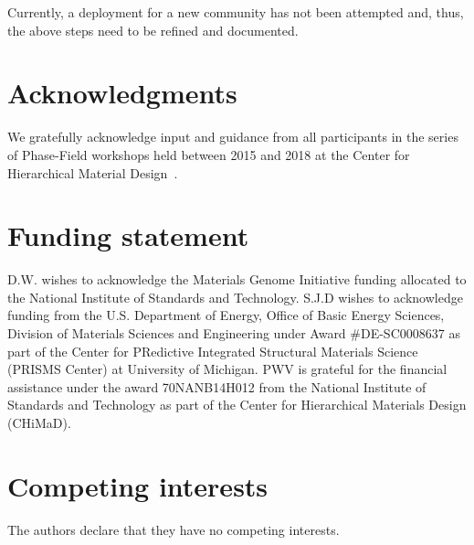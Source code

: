 \documentclass{jors}
\begin{document}
Currently, a deployment for a new community has not been attempted
and, thus, the above steps need to be refined and documented.

\section*{Acknowledgments}

We gratefully acknowledge input and guidance from all participants in
the series of Phase-Field workshops held between 2015 and 2018 at the
Center for Hierarchical Material Design~\cite{workshops}.

\section*{Funding statement}

D.W. wishes to acknowledge the Materials Genome Initiative funding
allocated to the National Institute of Standards and Technology. S.J.D
wishes to acknowledge funding from the U.S. Department of Energy,
Office of Basic Energy Sciences, Division of Materials Sciences and
Engineering under Award \#DE-SC0008637 as part of the Center for
PRedictive Integrated Structural Materials Science (PRISMS Center) at
University of Michigan. PWV is grateful for the financial assistance
under the award 70NANB14H012 from the National Institute of Standards
and Technology as part of the Center for Hierarchical Materials Design
(CHiMaD).

\section*{Competing interests}

The authors declare that they have no competing interests.

\printbibliography
\end{document}
